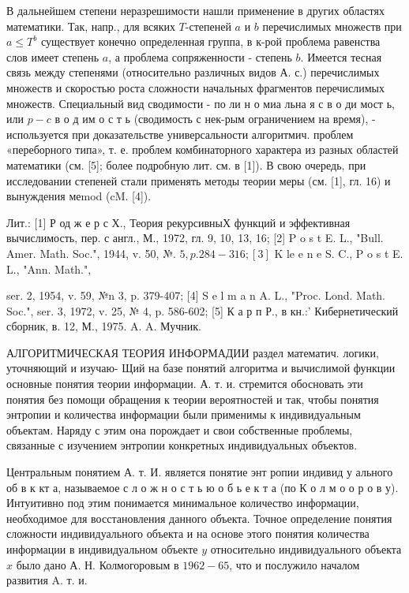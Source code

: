 \documentclass[10pt]{article}
\begin{document}
В дальнейшем степени неразрешимости нашли применение в других областях математики. Так, напр., для всяких $T$-степеней $a$ и $b$ перечислимых множеств при $a \leqslant T^{b}$ существует конечно определенная группа, в к-рой проблема равенства слов имеет степень $a$, а проблема сопряженности - степень $b$. Имеется тесная связь между степенями (относительно различных видов А. с.) перечислимых множеств и скоростью роста сложности начальных фрагментов перечислимых множеств. Специальный вид сводимости - по ли н о миа льна я с в о ди мост ь, или $p-c$ в о д им о с т ь (сводимость с нек-рым ограничением на время), - используется при доказательстве универсальности алгоритмич. проблем «переборного типа», т. е. проблем комбинаторного характера из разных областей математики (см. [5]; более подробную лит. см. в [1]). В свою очередь, при исследовании степеней стали применять методы теории меры (см. [1], гл. 16) и вынуждения меmod (cM. [4]).



Лит.: [1] Р од ж е р с Х., Теория рекурсивныХ функций и эффективная вычислимость, пер. с англ., М., 1972, гл. 9, 10, 13, 16; [2] P o s t E. L., "Bull. Amer. Math. Soc.", 1944, v. 50, №. $5, p .284-316 ;[3]$ K le e n e S. C., P o s t E. L., "Ann. Math.",

ser. 2, 1954, v. 59, №n 3, p. 379-407; [4] S e l m a n A. L., "Proc. Lond. Math. Soc.", ser. 3, 1972, v. 25, № 4, p. 586-602; [5] К а р п Р., в кн.:' Кибернетический сборник, в. 12, М., 1975. A. A. Мучник.



АЛГОРИТМИЧЕСКАЯ ТЕОРИЯ ИНФОРМАДИИ раздел математич. логики, уточняющий и изучаю- Щий на базе понятий алгоритма и вычислимой функции основные понятия теории информации. А. т. и. стремится обосновать эти понятия без помощи обращения к теории вероятностей и так, чтобы понятия энтропии и количества информации были применимы к индивидуальным объектам. Наряду с этим она порождает и свои собственные проблемы, связанные с изучением энтропии конкретных индивидуальных объектов.



Центральным понятием А. т. И. является понятие энт ропии индивид у ального об в к кт а, называемое с л о ж н о с т ь ю о б ь е к т а (по К о л м о о р о в у). Интуитивно под этим понимается минимальное количество информации, необходимое для восстановления данного объекта. Точное определение понятия сложности индивидуального объекта и на основе этого понятия количества информации в индивидуальном объекте $y$ относительно индивидуального объекта $x$ было дано А. Н. Колмогоровым в $1962-65$, что и послужило началом развития A. т. и.
\end{document}
